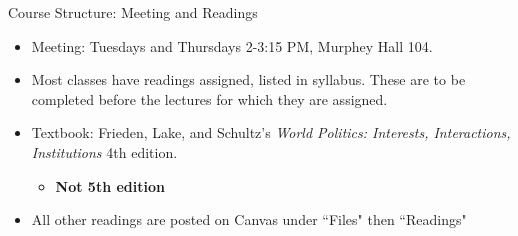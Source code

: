 \documentclass{beamer}
\begin{document}

\begin{frame}{\LARGE Course Structure: Meeting and Readings}
	\begin{itemize}
		\item Meeting: Tuesdays and Thursdays 2-3:15 PM, Murphey Hall 104.
		\item Most classes have readings assigned, listed in syllabus. These are to be completed before the lectures for which they are assigned.
		\item Textbook: Frieden, Lake, and Schultz's \textit{World Politics: Interests, Interactions, Institutions} 4th edition.
		\begin{itemize}
			\item \textbf{Not 5th edition}
		\end{itemize}
		\item All other readings are posted on Canvas under ``Files" then ``Readings"
	\end{itemize}
\end{frame}
\end{document}
